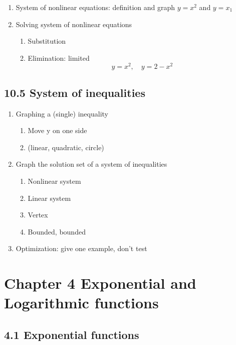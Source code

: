 \documentclass{article}
\begin{document}
\begin{enumerate}
\item System of nonlinear equations: definition and graph $y = x^2$ and $y = x_1$
\item Solving system of nonlinear equations
\begin{enumerate}
\item Substitution
\item Elimination: limited
$$
y = x^2, \quad y = 2-x^2
$$
\end{enumerate}
\end{enumerate}

\subsection{10.5 System of inequalities}

\begin{enumerate}
\item Graphing a (single) inequality 
\begin{enumerate}
\item Move y on one side
\item (linear, quadratic, circle)
\end{enumerate}
\item Graph the solution set of a system of inequalities
\begin{enumerate}
\item Nonlinear system
\item Linear system
\item Vertex
\item Bounded, bounded 
\end{enumerate}
\item Optimization: give one example, don't test
\end{enumerate}

\section{Chapter 4 Exponential and Logarithmic functions}


\subsection{4.1 Exponential functions}
\end{document}
